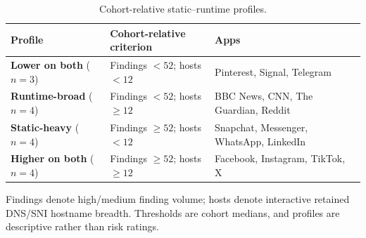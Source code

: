 \begin{table}[!t]
\centering
\caption{Cohort-relative static--runtime profiles.}
\label{tab:integrated-profile-matrix}
\footnotesize
\setlength{\tabcolsep}{3pt}
\renewcommand{\arraystretch}{1.14}
\begin{tabularx}{\columnwidth}{@{}>{\raggedright\arraybackslash}p{}>{\raggedright\arraybackslash}p{}>{\raggedright\arraybackslash}X@{}}
\toprule
Profile & Cohort-relative criterion & Apps \\
\midrule
\textbf{Lower on both} ($n=3$) & Findings $<52$; hosts $<12$ & Pinterest, Signal, Telegram \\
\textbf{Runtime-broad} ($n=4$) & Findings $<52$; hosts $\geq 12$ & BBC News, CNN, The Guardian, Reddit \\
\textbf{Static-heavy} ($n=4$) & Findings $\geq 52$; hosts $<12$ & Snapchat, Messenger, WhatsApp, LinkedIn \\
\textbf{Higher on both} ($n=4$) & Findings $\geq 52$; hosts $\geq 12$ & Facebook, Instagram, TikTok, X \\
\bottomrule
\end{tabularx}
\par\vspace{3pt}
\noindent\parbox{\columnwidth}{\footnotesize Findings denote high/medium finding volume; hosts denote interactive retained DNS/SNI hostname breadth. Thresholds are cohort medians, and profiles are descriptive rather than risk ratings.}
\end{table}
